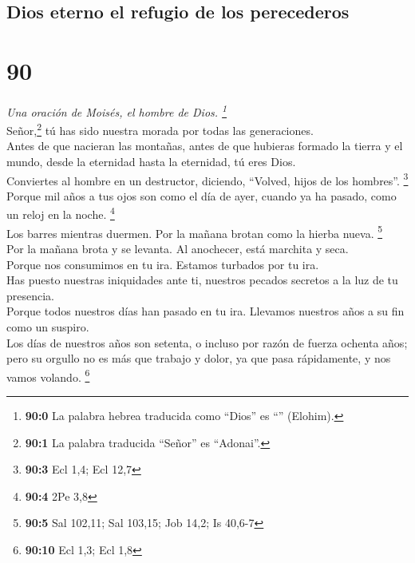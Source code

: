 \hypertarget{dios-eterno-el-refugio-de-los-perecederos}{%
\subsection{Dios eterno el refugio de los
perecederos}\label{dios-eterno-el-refugio-de-los-perecederos}}

\hypertarget{section-87}{%
\section{90}\label{section-87}}

\emph{Una oración de Moisés, el hombre de Dios. \footnote{\textbf{90:0}
  La palabra hebrea traducida como ``Dios'' es ``''
  (Elohim).}}\\
 Señor,\footnote{\textbf{90:1} La palabra traducida
  ``Señor'' es ``Adonai''.} tú has sido nuestra morada por todas las
generaciones.\\
 Antes de que nacieran las montañas, antes de que hubieras
formado la tierra y el mundo, desde la eternidad hasta la eternidad, tú
eres Dios.\\
 Conviertes al hombre en un destructor, diciendo,
``Volved, hijos de los hombres''. \footnote{\textbf{90:3} Ecl 1,4; Ecl
  12,7}\\
 Porque mil años a tus ojos son como el día de ayer,
cuando ya ha pasado, como un reloj en la noche. \footnote{\textbf{90:4}
  2Pe 3,8}\\
 Los barres mientras duermen. Por la mañana brotan como la
hierba nueva. \footnote{\textbf{90:5} Sal 102,11; Sal 103,15; Job 14,2;
  Is 40,6-7}\\
 Por la mañana brota y se levanta. Al anochecer, está
marchita y seca.\\
 Porque nos consumimos en tu ira. Estamos turbados por tu
ira.\\
 Has puesto nuestras iniquidades ante ti, nuestros pecados
secretos a la luz de tu presencia.\\
 Porque todos nuestros días han pasado en tu ira. Llevamos
nuestros años a su fin como un suspiro.\\
 Los días de nuestros años son setenta, o incluso por
razón de fuerza ochenta años; pero su orgullo no es más que trabajo y
dolor, ya que pasa rápidamente, y nos vamos volando. \footnote{\textbf{90:10}
  Ecl 1,3; Ecl 1,8}\\
